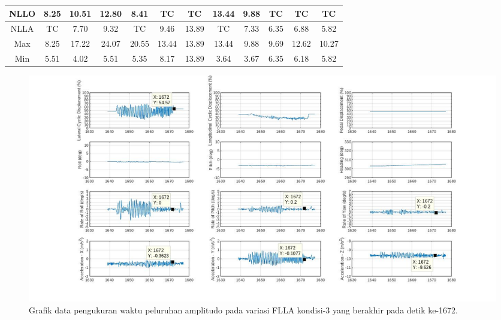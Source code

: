 \begin{table}[]
\begin{tabular}{|c|ccccccccccc|}
		NLLO & \multicolumn{1}{c|}{8.25} & \multicolumn{1}{c|}{10.51} & \multicolumn{1}{c|}{12.80} & \multicolumn{1}{c|}{8.41} & \multicolumn{1}{c|}{\cellcolor[HTML]{FFFFC7}TC} & \multicolumn{1}{c|}{\cellcolor[HTML]{FFFFC7}TC} & \multicolumn{1}{c|}{13.44} & \multicolumn{1}{c|}{9.88} & \multicolumn{1}{c|}{\cellcolor[HTML]{FFFFC7}TC} & \multicolumn{1}{c|}{\cellcolor[HTML]{FFFFC7}TC} & \cellcolor[HTML]{FFFFC7}TC \\ \hline
		NLLA & \multicolumn{1}{c|}{\cellcolor[HTML]{FFFFC7}TC} & \multicolumn{1}{c|}{7.70} & \multicolumn{1}{c|}{9.32} & \multicolumn{1}{c|}{\cellcolor[HTML]{FFFFC7}TC} & \multicolumn{1}{c|}{9.46} & \multicolumn{1}{c|}{13.89} & \multicolumn{1}{c|}{\cellcolor[HTML]{FFFFC7}TC} & \multicolumn{1}{c|}{7.33} & \multicolumn{1}{c|}{6.35} & \multicolumn{1}{c|}{6.88} & 5.82 \\ \hline
		Max & \multicolumn{1}{c|}{8.25} & \multicolumn{1}{c|}{17.22} & \multicolumn{1}{c|}{24.07} & \multicolumn{1}{c|}{20.55} & \multicolumn{1}{c|}{13.44} & \multicolumn{1}{c|}{13.89} & \multicolumn{1}{c|}{13.44} & \multicolumn{1}{c|}{9.88} & \multicolumn{1}{c|}{9.69} & \multicolumn{1}{c|}{12.62} & 10.27 \\ \hline
		Min & \multicolumn{1}{c|}{5.51} & \multicolumn{1}{c|}{4.02} & \multicolumn{1}{c|}{5.51} & \multicolumn{1}{c|}{5.35} & \multicolumn{1}{c|}{8.17} & \multicolumn{1}{c|}{13.89} & \multicolumn{1}{c|}{3.64} & \multicolumn{1}{c|}{3.67} & \multicolumn{1}{c|}{6.35} & \multicolumn{1}{c|}{6.18} & 5.82 \\ \hline
	\end{tabular}
\end{table}

\begin{figure}[H]
	\centering
	\includegraphics[width=1\linewidth]{gambar/Max_dr.jpg}
	\caption{Grafik data pengukuran waktu peluruhan amplitudo pada variasi FLLA kondisi-3 yang berakhir pada detik ke-1672.}
	\label{fig:FLLA-3}
\end{figure}

